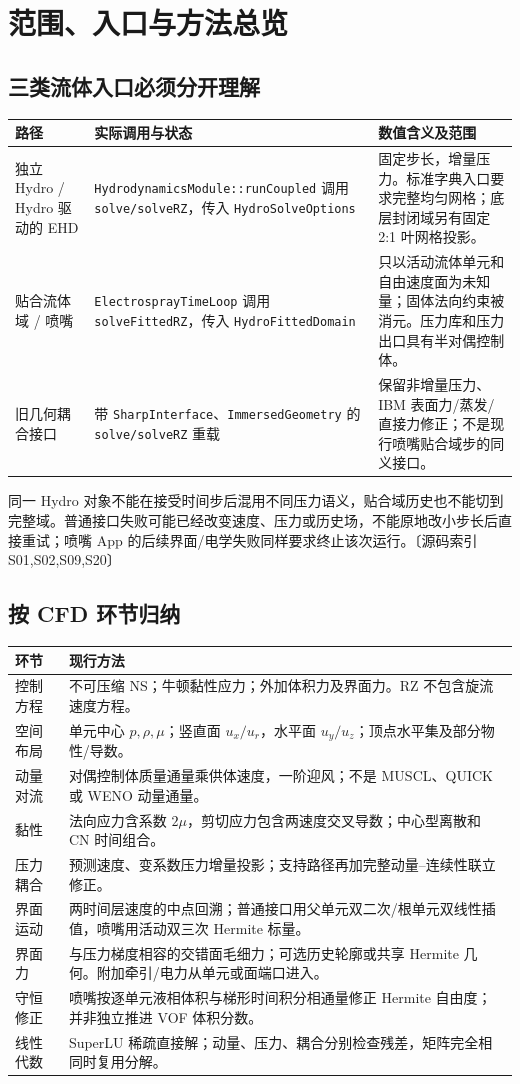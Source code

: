 \documentclass[UTF8,a4paper,11pt,fontset=fandol]{ctexart}
\newcommand{\code}[1]{\nolinkurl{#1}}
\newcommand{\src}[1]{\textcolor{ink}{\small〔源码索引 #1〕}}
\begin{document}
\section{范围、入口与方法总览}
\subsection{三类流体入口必须分开理解}
\begin{longtable}{@{}p{}p{}p{}@{}}
\toprule 路径 & 实际调用与状态 & 数值含义及范围\\\midrule\endhead
独立 Hydro / Hydro 驱动的 EHD & \code{HydrodynamicsModule::runCoupled} 调用 \code{solve/solveRZ}，传入 \code{HydroSolveOptions} & 固定步长，增量压力。标准字典入口要求完整均匀网格；底层封闭域另有固定 2:1 叶网格投影。\\
贴合流体域 / 喷嘴 & \code{ElectrosprayTimeLoop} 调用 \code{solveFittedRZ}，传入 \code{HydroFittedDomain} & 只以活动流体单元和自由速度面为未知量；固体法向约束被消元。压力库和压力出口具有半对偶控制体。\\
旧几何耦合接口 & 带 \code{SharpInterface}、\code{ImmersedGeometry} 的 \code{solve/solveRZ} 重载 & 保留非增量压力、IBM 表面力/蒸发/直接力修正；不是现行喷嘴贴合域步的同义接口。\\
\bottomrule
\end{longtable}
同一 Hydro 对象不能在接受时间步后混用不同压力语义，贴合域历史也不能切到完整域。普通接口失败可能已经改变速度、压力或历史场，不能原地改小步长后直接重试；喷嘴 App 的后续界面/电学失败同样要求终止该次运行。\src{S01,S02,S09,S20}

\subsection{按 CFD 环节归纳}
\begin{longtable}{@{}p{}p{}@{}}
\toprule 环节 & 现行方法\\\midrule\endhead
控制方程 & 不可压缩 NS；牛顿黏性应力；外加体积力及界面力。RZ 不包含旋流速度方程。\\
空间布局 & 单元中心 $p,\rho,\mu$；竖直面 $u_x/u_r$，水平面 $u_y/u_z$；顶点水平集及部分物性/导数。\\
动量对流 & 对偶控制体质量通量乘供体速度，一阶迎风；不是 MUSCL、QUICK 或 WENO 动量通量。\\
黏性 & 法向应力含系数 $2\mu$，剪切应力包含两速度交叉导数；中心型离散和 CN 时间组合。\\
压力耦合 & 预测速度、变系数压力增量投影；支持路径再加完整动量--连续性联立修正。\\
界面运动 & 两时间层速度的中点回溯；普通接口用父单元双二次/根单元双线性插值，喷嘴用活动双三次 Hermite 标量。\\
界面力 & 与压力梯度相容的交错面毛细力；可选历史轮廓或共享 Hermite 几何。附加牵引/电力从单元或面端口进入。\\
守恒修正 & 喷嘴按逐单元液相体积与梯形时间积分相通量修正 Hermite 自由度；并非独立推进 VOF 体积分数。\\
线性代数 & SuperLU 稀疏直接解；动量、压力、耦合分别检查残差，矩阵完全相同时复用分解。\\
\bottomrule
\end{longtable}
\end{document}

